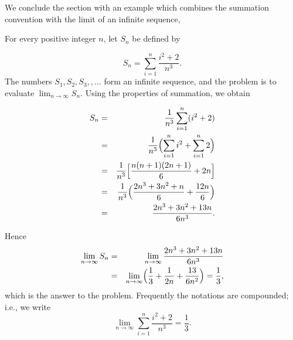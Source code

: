 We conclude the section with an example which combines the summation convention with the limit of an infinite sequence,
\medskip
\begin{example} For every positive integer $n$, let $S_n$ be defined by

$$
S_n = \sum_{i = 1}^n \frac{i^2 + 2}{n^3}.
$$
\noindent The numbers $S_1, S_2, S_3, ,...$ form an infinite sequence, and the problem is to evaluate $\lim_{n \rightarrow \infty} S_n$.  Using the properties of summation, we obtain

\begin{eqnarray*}
S_n &=& \frac{1}{n^3} \sum_{i = 1}^{n}  (i ^2 + 2) \\
       &=& \frac{1}{n^3} \Bigl( \sum_{i = 1} ^{n} i^2 + \sum_{i=1} ^{n} 2 \Bigr) \\
       &=& \frac{1}{n^3} \Bigl[\frac{n(n + 1)(2n + 1)}{6}  + 2n \Bigr] \\
       &=& \frac{1}{n^3} \Bigl( \frac{2n^3 + 3n^2 + n}{6} + \frac{12n}{6} \Bigr) \\
       &=& \frac{2n^3 + 3n^2 + 13n}{6 n^3}.
\end{eqnarray*}
 
\noindent Hence 
\begin{eqnarray*}
\lim_{n \rightarrow \infty} S_n &=& \lim_{n \rightarrow \infty} \frac{2n^3 + 3n^2 + 13n}{6n^3}\\
&=& \lim_{n \rightarrow \infty} \Bigl( \frac{1}{3} + \frac{1}{2n} + \frac{13}{6n^2} \Bigr) = \frac{1}{3},
\end{eqnarray*}
\noindent which is the answer to the problem. Frequently the notations are compounded; i.e., we write
$$
\lim_{n \rightarrow \infty} \sum_{i = 1}^{n} \frac{i^2 + 2}{n^3} = \frac{1}{3}.
$$
\end{example}
